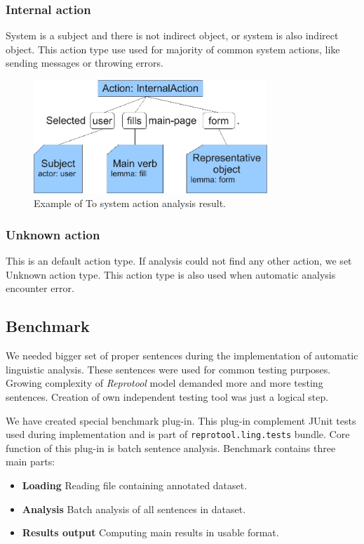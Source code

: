 \subsubsection{Internal action}
System is a subject and there is not indirect object, or system is also indirect object. This action type use used for majority of common system actions, like sending messages or throwing errors.

\begin{figure}[ht]
  \centering
  \includegraphics[width=250pt]{images/ToSystemActionExample}
  \caption{Example of To system action analysis result.}
  \label{fig:ToSystemActionExample}
\end{figure}

\subsubsection{Unknown action}
This is an default action type. If analysis could not find any other action, we set Unknown action type. This action type is also used when automatic analysis encounter error. 

\subsection{Benchmark}
\label{sec:benchmark}

We needed bigger set of proper sentences during the implementation of automatic linguistic analysis. These sentences were used for common testing purposes. Growing complexity of \emph{Reprotool} model demanded more and more testing sentences. Creation of own independent testing tool was just a logical step.

We have created special benchmark plug-in. This plug-in complement JUnit tests used during implementation and is part of {\tt reprotool.ling.tests} bundle. Core function of this plug-in is batch sentence analysis. Benchmark contains three main parts:

\begin{itemize}
\item {\bf Loading} Reading file containing annotated dataset.
\item {\bf Analysis} Batch analysis of all sentences in dataset.
\item {\bf Results output} Computing main results in usable format.
\end{itemize}


